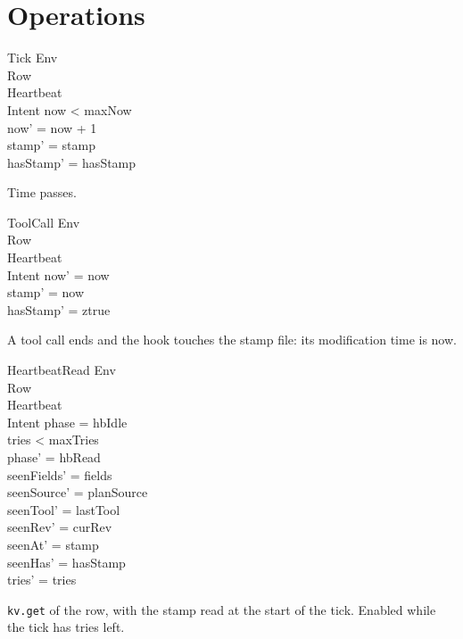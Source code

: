 \documentclass[a4paper,10pt,fleqn]{article}
\begin{document}
\section{Operations}

\begin{schema}{Tick}
  \Delta Env \\
  \Xi Row \\
  \Xi Heartbeat \\
  \Xi Intent
  \where
  now < maxNow \\
  now' = now + 1 \\
  stamp' = stamp \\
  hasStamp' = hasStamp
\end{schema}

Time passes.

\begin{schema}{ToolCall}
  \Delta Env \\
  \Xi Row \\
  \Xi Heartbeat \\
  \Xi Intent
  \where
  now' = now \\
  stamp' = now \\
  hasStamp' = ztrue
\end{schema}

A tool call ends and the hook touches the stamp file: its modification time is
now.

\begin{schema}{HeartbeatRead}
  \Xi Env \\
  \Xi Row \\
  \Delta Heartbeat \\
  \Xi Intent
  \where
  phase = hbIdle \\
  tries < maxTries \\
  phase' = hbRead \\
  seenFields' = fields \\
  seenSource' = planSource \\
  seenTool' = lastTool \\
  seenRev' = curRev \\
  seenAt' = stamp \\
  seenHas' = hasStamp \\
  tries' = tries
\end{schema}

\texttt{kv.get} of the row, with the stamp read at the start of the tick.
Enabled while the tick has tries left.
\end{document}
